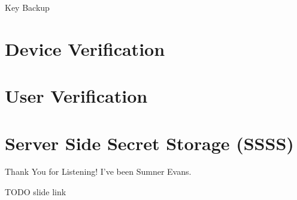 \documentclass{beeper}
\begin{document}
\begin{frame}{Key Backup}
\end{frame}

\section{Device Verification}

\section{User Verification}

\section{Server Side Secret Storage (SSSS)}

\begin{frame}{Thank You for Listening!}
    I've been Sumner Evans.

    TODO slide link
\end{frame}
\end{document}

